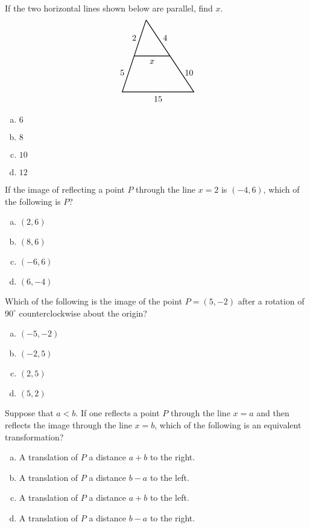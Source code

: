 \documentclass[12pt,letterpaper]{exam}
\begin{document}
\begin{questions}
\question If the two horizontal lines shown below are parallel, find $x$.
	\[
	\begin{tikzpicture}
	\draw[line width=0.03cm] (0,3) -- (-1,0) -- (2,0) -- (0,3);
	\draw[line width=0.03cm] (-0.5,1.5) -- (1,1.5);
	\node at (0.25,1.25) {$x$};
	\node at (0.5,-0.3) {$15$};
	\node at (-0.5,2.25) {$2$};
	\node at (0.8,2.25) {$4$};
	\node at (-1,0.8) {$5$};

	\node at (1.8,0.8) {$10$};
	\end{tikzpicture}
	\]

\begin{enumerate}[(a)]
\item $6$
\item $8$
\item $10$
\item $12$
\end{enumerate} \vfill



\question If the image of reflecting a point $P$ through the line $x= 2$ is $(-4, 6)$, which of the following is $P$?
	\begin{enumerate}[(a)]
	\item $(2, 6)$
	\item $(8, 6)$
	\item $(-6, 6)$
	\item $(6, -4)$
	\end{enumerate} \vfill



\newpage



\question Which of the following is the image of the point $P= (5, -2)$ after a rotation of $90^\circ$ counterclockwise about the origin?
	\begin{enumerate}[(a)]
	\item $(-5, -2)$
	\item $(-2, 5)$
	\item $(2, 5)$
	\item $(5, 2)$
	\end{enumerate} \vfill



\question Suppose that $a < b$. If one reflects a point $P$ through the line $x= a$ and then reflects the image through the line $x= b$, which of the following is an equivalent transformation? 
	\begin{enumerate}[(a)]
	\item A translation of $P$ a distance $a + b$ to the right. 
	\item A translation of $P$ a distance $b - a$ to the left. 
	\item A translation of $P$ a distance $a + b$ to the left.  
	\item A translation of $P$ a distance $b - a$ to the right. 
	\end{enumerate} \vfill
	



\end{questions}
\end{document}

